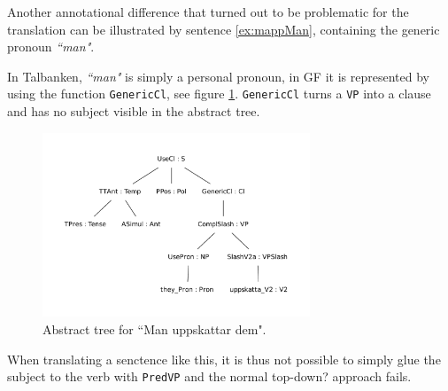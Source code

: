 \documentclass{report}
\begin{document}
Another annotational difference that turned out to be problematic for the
translation can be illustrated by sentence \ref{ex:mappMan}, containing
the generic pronoun \emph{``man"}.
\label{ex:mappMan} %

In Talbanken, \emph{``man"} is simply a personal pronoun, 
in GF it is represented by using the function \verb|GenericCl|, see figure
\ref{fig:mappMan}. \verb|GenericCl| turns a \verb-VP- into a clause and has no
subject visible in the abstract tree. 
\begin{figure}[h]
\centering
\includegraphics[width=80mm]{man.pdf}
\caption{Abstract tree for ``Man uppskattar dem".}
\label{fig:mappMan}
\end{figure}
When translating a senctence like this, it is thus not possible to simply glue the
subject to the verb with \verb|PredVP| and the normal top-down? approach fails.\\

%
\end{document}
